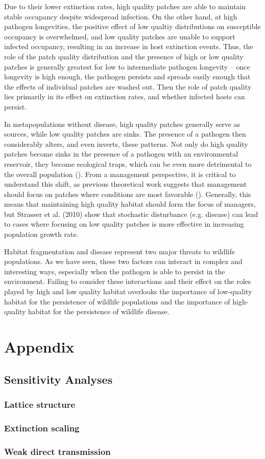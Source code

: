 \documentclass{svjour3}
\begin{document}
Due to their lower extinction rates, high quality patches are able to maintain stable occupancy despite widespread infection.  On the other hand, at high pathogen longevities, the positive effect of low qualtiy distributions on susceptible occupancy is overwhelmed, and low quality patches are unable to support infected occupancy, resulting in an increase in host extinction events.  Thus, the role of the patch quality distribution and the presence of high or low quality patches is generally greatest for low to intermediate pathogen longevity -- once longevity is high enough, the pathogen persists and spreads easily enough that the effects of individual patches are washed out.  Then the role of patch quality lies primarily in its effect on extinction rates, and whether infected hosts can persist.

In metapopulations without disease, high quality patches generally serve as sources, while low quality patches are sinks.  The presence of a pathogen then considerably alters, and even inverts, these patterns.  Not only do high quality patches become sinks in the presence of a pathogen with an environmental reservoir, they become ecological traps, which can be even more detrimental to the overall population (\cite{Kristan2003}).  From a management perspective, it is critical to understand this shift, as previous theoretical work suggests that management should focus on patches where conditions are most favorable (\cite{Strasser2010}).  Generally, this means that maintaining high quality habitat should form the focus of managers, but Strasser et al. (2010) show that stochastic disturbance (e.g. disease) can lead to cases where focusing on low quality patches is more effective in increasing population growth rate.

Habitat fragmentation and disease represent two major threats to wildlife populations.  As we have seen, these two factors can interact in complex and interesting ways, especially when the pathogen is able to persist in the environment.  Failing to consider these interactions and their effect on the roles played by high and low quality habitat overlooks the importance of low-quality habitat for the persistence of wildlife populations and the importance of high-quality habitat for the persistence of wildlife disease.

\clearpage

\section{Appendix}

\subsection{Sensitivity Analyses}

\subsubsection{Lattice structure}

\subsubsection{Extinction scaling}

\subsubsection{Weak direct transmission}


     
\end{document}
